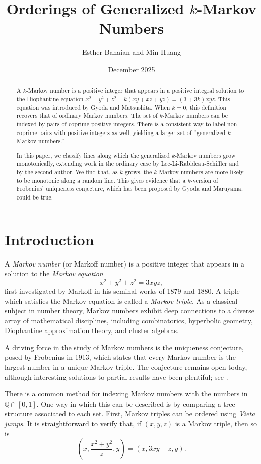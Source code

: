 \documentclass{article}
\title{Orderings of Generalized $k$-Markov Numbers}
\author{Esther Banaian and Min Huang}
\date{December 2025}
\theoremstyle{remark}
\begin{document}
\maketitle


\begin{abstract}
A $k$-Markov number is a positive integer that appears in a positive integral solution to the Diophantine equation $x^2 + y^2 + z^2 + k(xy + xz + yz) = (3+3k)xyz$. This equation was introduced by Gyoda and Matsushita. When $k =0$, this definition recovers that of ordinary Markov numbers. The set of $k$-Markov numbers can be indexed by pairs of coprime positive integers. There is a consistent way to label non-coprime pairs with positive integers as well, yielding a larger set of ``generalized $k$-Markov numbers.''

In this paper, we classify lines along which the generalized $k$-Markov numbers grow monotonically, extending work in the ordinary case by Lee-Li-Rabideau-Schiffler and by the second author. We find that, as $k$ grows, the $k$-Markov numbers are more likely to be monotonic along a random line. This gives evidence that a $k$-version of Frobenius' uniqueness conjecture, which has been proposed by Gyoda and Maruyama, could be true.  
\end{abstract}


\section{Introduction}

A \emph{Markov number‌} (or Markoff number) is a positive integer that appears in a solution to the ‌\emph{Markov equation‌}
\[x^2+y^2+z^2=3xyz,\]
first investigated by Markoff in his seminal works of 1879 and 1880. A triple which satisfies the Markov equation is called a \emph{Markov triple}. As a classical subject in number theory, Markov numbers exhibit deep connections to a diverse array of mathematical disciplines, including combinatorics, hyperbolic geometry, Diophantine approximation theory, and cluster algebras.

A driving force in the study of Markov numbers is the uniqueness conjecture, posed by Frobenius in 1913, which states that every Markov number is the largest number in a unique Markov triple. The conjecture remains open today, although interesting solutions to partial results have been plentiful; see \cite{aigner2013Markov,Reutenauer}.

There is a common method for indexing Markov numbers with the numbers in $\mathbb{Q} \cap [0,1]$. One way in which this can be described is by comparing a tree structure associated to each set. First, Markov triples can be ordered using \emph{Vieta jumps}. It is straightforward to verify that, if $(x,y,z)$ is a Markov triple, then so is \[
(x,\frac{x^2 + y^2}{z},y) = (x,3xy-z,y).
\]
\end{document}
